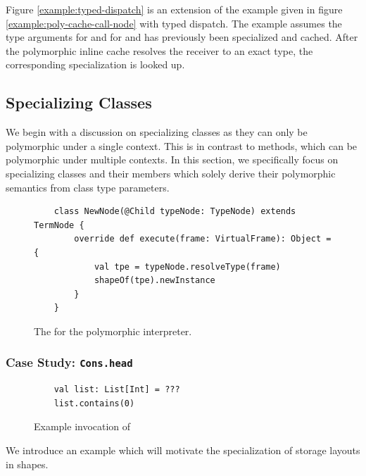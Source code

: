 Figure \ref{example:typed-dispatch} is an extension of the example given in figure \ref{example:poly-cache-call-node} with typed dispatch.
The example assumes the type arguments for  and  for  and  has previously been specialized and cached.
After the polymorphic inline cache resolves the receiver to an exact type, the corresponding specialization is looked up.

\subsection{Specializing Classes}

We begin with a discussion on specializing classes as they can only be polymorphic under a single context.
This is in contrast to methods, which can be polymorphic under multiple contexts.
In this section, we specifically focus on specializing classes and their members which solely derive their polymorphic semantics from class type parameters.

\begin{figure}[!htb]
	\begin{verbatim}
	class NewNode(@Child typeNode: TypeNode) extends TermNode {
		override def execute(frame: VirtualFrame): Object = {
			val tpe = typeNode.resolveType(frame)
			shapeOf(tpe).newInstance
		}
	}
	\end{verbatim}
	\caption{The  for the polymorphic interpreter.}
\end{figure}

\subsubsection*{Case Study: \texttt{Cons.head}}

\begin{figure}[!htb]
	\begin{verbatim}
	val list: List[Int] = ???
	list.contains(0)
	\end{verbatim}
	\caption{Example invocation of }
\end{figure}

We introduce an example which will motivate the specialization of storage layouts in shapes.

